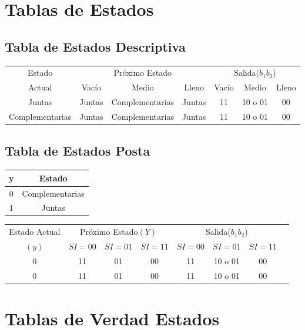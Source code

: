 \documentclass[10pt,a4paper]{article}
\begin{document}
\section*{Tablas de Estados}
\subsection*{Tabla de Estados Descriptiva}

\begin{table}[ht]
	\centering
	\begin{tabular}{c|ccc|ccc}
	Estado & \multicolumn{3}{c|}{Próximo Estado} & \multicolumn{3}{c|}{Salida($b_1b_2$)}\\
	\cline{2-7}
	Actual 				& Vacío 	& Medio 			& Lleno 	& Vacío & Medio 	& Lleno \\
	\hline
	Juntas 				& Juntas 	& Complementarias 	& Juntas 	& 11 	& 10 o 01 	& 00\\
	Complementarias 	& Juntas 	& Complementarias 	& Juntas 	& 11  	& 10 o 01	& 00\\
	\end{tabular}
\end{table}

\subsection*{Tabla de Estados Posta}


\begin{tabular}{|c|c|}
\hline 
y & Estado \\ 
\hline 
0 & Complementarias \\ 
\hline 
1 & Juntas \\ 
\hline 
\end{tabular} 

\begin{table}[ht]
	\centering
	\begin{tabular}{c|c|c|c|c|c|c|c}
	Estado Actual & \multicolumn{3}{c|}{Próximo Estado$(Y)$} & \multicolumn{3}{c|}{Salida($b_1b_2$)}\\
	\cline{2-7}
	$(y)$ & $SI=00$ & $SI=01$ & $SI=11$ & $SI=00$ & $SI=01$ & $SI=11$ \\
	\hline
	0 & 11 & 01 & 00 & 11 & 10 o 01 & 00 \\
	0 & 11 & 01 & 00 & 11 & 10 o 01 & 00\\
	\end{tabular}
\end{table}

\section*{Tablas de Verdad Estados}
\end{document}
